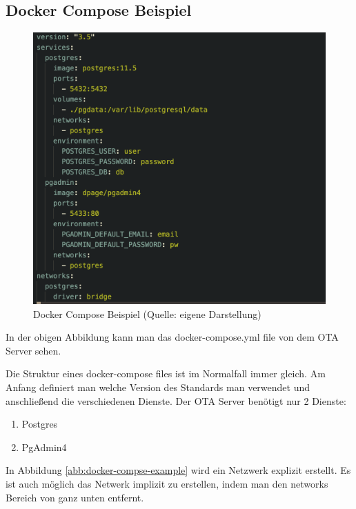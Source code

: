 \subsection{Docker Compose Beispiel}

\begin{figure}[H]
    \begin{center}
        \includegraphics[scale=0.8]{images/docker_compose_example.png}
        \caption{Docker Compose Beispiel (Quelle: eigene Darstellung)}
        \label{abb:docker-compose-example}
    \end{center}
\end{figure}

In der obigen Abbildung kann man das docker-compose.yml file von dem OTA Server sehen.

Die Struktur eines docker-compose files ist im Normalfall immer gleich. Am Anfang definiert man welche Version des Standards man verwendet und anschließend die verschiedenen Dienste. Der OTA Server benötigt nur 2 Dienste:

\begin{enumerate}
    \item Postgres
    \item PgAdmin4
\end{enumerate}

In Abbildung \ref{abb:docker-compse-example} wird ein Netzwerk explizit erstellt. Es ist auch möglich das Netwerk implizit zu erstellen, indem man den networks Bereich von ganz unten entfernt.

